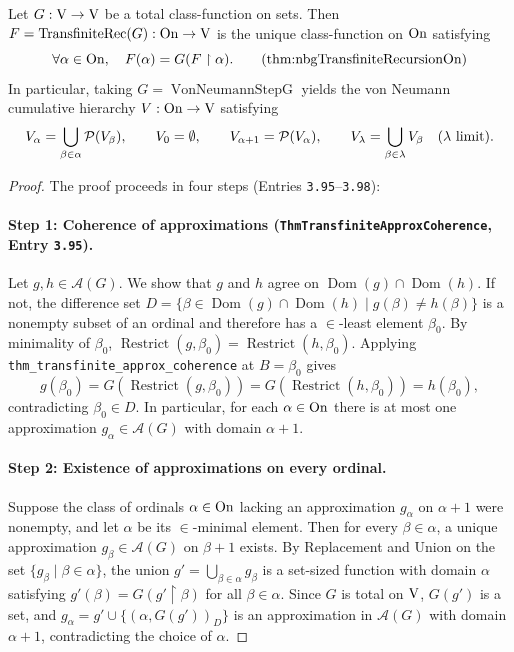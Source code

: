 \begin{theorem}
Let $G : \mathrm{V} \to \mathrm{V}$ be a total class-function on sets. Then $F = \operatorname{TransfiniteRec}(G) : \mathrm{On} \to \mathrm{V}$ is the unique class-function on $\mathrm{On}$ satisfying
\[
\forall \alpha \in \On,\quad F(\alpha) = G(F \upharpoonright \alpha).
\labeltagd{thm}{nbgTransfiniteRecursionOn}
\]
In particular, taking $G = \operatorname{VonNeumannStepG}$ yields the von Neumann cumulative hierarchy $V : \mathrm{On} \to \mathrm{V}$ satisfying
\[
V_\alpha = \bigcup_{\beta \in \alpha} \mathcal{P}(V_\beta),\qquad
V_0 = \emptyset,\qquad
V_{\alpha+1} = \mathcal{P}(V_\alpha),\qquad
V_\lambda = \bigcup_{\beta \in \lambda} V_\beta\quad (\lambda \text{ limit}).
\]
\end{theorem}
\begin{proof}
The proof proceeds in four steps (Entries \texttt{3.95}--\texttt{3.98}):

\paragraph{Step 1: Coherence of approximations (\texttt{ThmTransfiniteApproxCoherence}, Entry \texttt{3.95}).}
Let $g, h \in \mathcal{A}(G)$. We show that $g$ and $h$ agree on $\operatorname{Dom}(g) \cap \operatorname{Dom}(h)$. If not, the difference set $D = \{\beta \in \operatorname{Dom}(g) \cap \operatorname{Dom}(h) \mid g(\beta) \neq h(\beta)\}$ is a nonempty subset of an ordinal and therefore has a $\in$-least element $\beta_0$. By minimality of $\beta_0$, $\operatorname{Restrict}(g, \beta_0) = \operatorname{Restrict}(h, \beta_0)$. Applying \texttt{thm\_transfinite\_approx\_coherence} at $B = \beta_0$ gives
\[
g(\beta_0) = G(\operatorname{Restrict}(g, \beta_0)) = G(\operatorname{Restrict}(h, \beta_0)) = h(\beta_0),
\]
contradicting $\beta_0 \in D$. In particular, for each $\alpha \in \mathrm{On}$ there is at most one approximation $g_\alpha \in \mathcal{A}(G)$ with domain $\alpha + 1$.

\paragraph{Step 2: Existence of approximations on every ordinal.}
Suppose the class of ordinals $\alpha \in \mathrm{On}$ lacking an approximation $g_\alpha$ on $\alpha + 1$ were nonempty, and let $\alpha$ be its $\in$-minimal element. Then for every $\beta \in \alpha$, a unique approximation $g_\beta \in \mathcal{A}(G)$ on $\beta + 1$ exists. By Replacement and Union on the set $\{g_\beta \mid \beta \in \alpha\}$, the union $g' = \bigcup_{\beta \in \alpha} g_\beta$ is a set-sized function with domain $\alpha$ satisfying $g'(\beta) = G(g' \upharpoonright \beta)$ for all $\beta \in \alpha$. Since $G$ is total on $\mathrm{V}$, $G(g')$ is a set, and $g_\alpha = g' \cup \{(\alpha, G(g'))_D\}$ is an approximation in $\mathcal{A}(G)$ with domain $\alpha + 1$, contradicting the choice of $\alpha$.


\end{proof}
